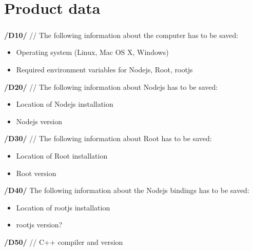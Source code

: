 \chapter{Product data}

\paragraph{}
\textbf{/D10/} //
The following information about the computer has to be saved: 
\begin{itemize}
	\item Operating system (Linux, Mac OS X, Windows) 
	\item Required environment variables for Nodejs, Root, rootjs 
\end{itemize}


\textbf{/D20/} //
The following information about Nodejs has to be saved: 
\begin{itemize}
	\item Location of Nodejs installation 
 	\item Nodejs version 
\end{itemize}

\textbf{/D30/} //
The following information about Root has to be saved:
\begin{itemize}
	\item Location of Root installation
	\item Root version
\end{itemize}

\textbf{/D40/}
The following information about the Nodejs bindings has to be saved:
\begin{itemize}
	\item Location of rootjs installation
	\item rootjs version?
\end{itemize}

\textbf{/D50/} //
C++ compiler and version
